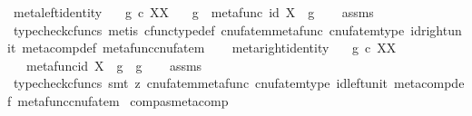 \begin{isabellebody}
%
\endisadelimproof
\isanewline
{}\isamarkupfalse%
\ meta{\isacharunderscore}{\kern0pt}left{\isacharunderscore}{\kern0pt}identity{\isacharcolon}{\kern0pt}\isanewline
\ \ \ {\isachardoublequoteopen}g\ {\isasymin}\isactrlsub c\ X\isactrlbsup X\isactrlesup {\isachardoublequoteclose}\isanewline
\ \ \ {\isachardoublequoteopen}g\ {\isasymbox}\ metafunc\ {\isacharparenleft}{\kern0pt}id\ X{\isacharparenright}{\kern0pt}\ {\isacharequal}{\kern0pt}\ g{\isachardoublequoteclose}\isanewline
%
\isadelimproof
\ \ %
\endisadelimproof
%
\isatagproof
{}\isamarkupfalse%
\ assms\ \isamarkupfalse%
\ {\isacharparenleft}{\kern0pt}typecheck{\isacharunderscore}{\kern0pt}cfuncs{\isacharcomma}{\kern0pt}\ metis\ cfunc{\isacharunderscore}{\kern0pt}type{\isacharunderscore}{\kern0pt}def\ cnufatem{\isacharunderscore}{\kern0pt}metafunc\ cnufatem{\isacharunderscore}{\kern0pt}type\ id{\isacharunderscore}{\kern0pt}right{\isacharunderscore}{\kern0pt}unit\ meta{\isacharunderscore}{\kern0pt}comp{}{\isacharunderscore}{\kern0pt}def{}\ metafunc{\isacharunderscore}{\kern0pt}cnufatem{\isacharparenright}{\kern0pt}%
\endisatagproof
{\isafoldproof}%
%
\isadelimproof
\isanewline
%
\endisadelimproof
\ \ \isanewline
{}\isamarkupfalse%
\ meta{\isacharunderscore}{\kern0pt}right{\isacharunderscore}{\kern0pt}identity{\isacharcolon}{\kern0pt}\isanewline
\ \ \ {\isachardoublequoteopen}g\ {\isasymin}\isactrlsub c\ X\isactrlbsup X\isactrlesup {\isachardoublequoteclose}\isanewline
\ \ \ {\isachardoublequoteopen}metafunc{\isacharparenleft}{\kern0pt}id\ X{\isacharparenright}{\kern0pt}\ {\isasymbox}\ g\ {\isacharequal}{\kern0pt}\ g{\isachardoublequoteclose}\isanewline
%
\isadelimproof
\ \ %
\endisadelimproof
%
\isatagproof
{}\isamarkupfalse%
\ assms\ \isamarkupfalse%
\ {\isacharparenleft}{\kern0pt}typecheck{\isacharunderscore}{\kern0pt}cfuncs{\isacharcomma}{\kern0pt}\ smt\ {\isacharparenleft}{\kern0pt}z{}{\isacharparenright}{\kern0pt}\ cnufatem{\isacharunderscore}{\kern0pt}metafunc\ cnufatem{\isacharunderscore}{\kern0pt}type\ id{\isacharunderscore}{\kern0pt}left{\isacharunderscore}{\kern0pt}unit{}\ meta{\isacharunderscore}{\kern0pt}comp{}{\isacharunderscore}{\kern0pt}def{}\ metafunc{\isacharunderscore}{\kern0pt}cnufatem{\isacharparenright}{\kern0pt}%
\endisatagproof
{\isafoldproof}%
%
\isadelimproof
\isanewline
%
\endisadelimproof
\isanewline
{}\isamarkupfalse%
\ comp{\isacharunderscore}{\kern0pt}as{\isacharunderscore}{\kern0pt}metacomp{\isacharcolon}{\kern0pt}\isanewline

\end{isabellebody}
